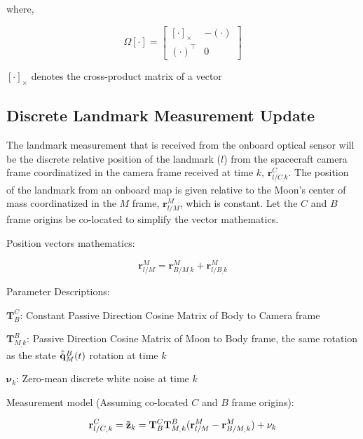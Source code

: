 \documentclass[conf]{new-aiaa}
\newcommand{\vect}[1]{\mathbf{#1}}
\newcommand{\mat}[1]{\mathbf{#1}}
\newcommand{\qBM}{\hat{\Bar{\mathbf{q}}}^B_{M}}    %
\newcommand{\rlO}{\vect{r}^M_{l/M}}
\newcommand{\rBO}{\vect{r}^M_{B/M_,k}}
\newcommand{\rlB}{\vect{r}^M_{l/B_,k}}
\newcommand{\rlBmeas}{\vect{r}^C_{l/C_,k}}
\newcommand{\TBM}{\mat{T}^B_{M_,k}}
\newcommand{\TCB}{\mat{T}^C_{B}}
\begin{document}
where,

\begin{equation}
\Omega[\cdot] =
\begin{bmatrix}
[\cdot]_\times & -(\cdot) \\[6pt]
(\cdot)^\top & 0
\end{bmatrix}
\label{eq:BIGOmegaQuatID}
\end{equation}

\begin{center}
$[\cdot]_\times$ denotes the cross-product matrix of a vector    
\end{center}






\subsection{Discrete Landmark Measurement Update}
 The landmark measurement that is received from the onboard optical sensor will be the discrete relative position of the landmark ($l$) from the spacecraft camera frame coordinatized in the camera frame received at time $k$, $\rlBmeas$. The position of the landmark from an onboard map is given relative to the Moon's center of mass coordinatized in the $M$ frame, $\rlO$, which is constant. Let the $C$ and $B$ frame origins be co-located to simplify the vector mathematics. 

\vspace{10pt}

Position vectors mathematics:

\begin{equation}
\rlO = \rBO + \rlB   
\label{eq:MeasRelPosDef}
\end{equation}



Parameter Descriptions:

$\TCB$: Constant Passive Direction Cosine Matrix of Body to Camera frame

$\TBM$: Passive Direction Cosine Matrix of Moon to Body frame, the same rotation as the state $\qBM(t)$ rotation at time $k$

$\vect{\nu}_{k}$: Zero-mean discrete white noise at time $k$

\vspace{10pt}

Measurement model (Assuming co-located $C$ and $B$ frame origins):
\vspace{10pt}

\begin{equation}
\rlBmeas = \vect{\Tilde{z}}_{k} = \TCB \TBM (\rlO - \rBO) + \vect{\nu}_{k}
\label{eq:MeasRelPosModel}
\end{equation}
\end{document}
